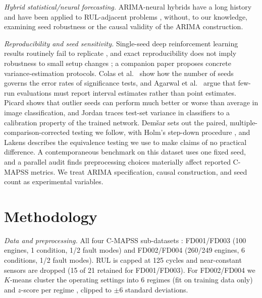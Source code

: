 \documentclass[conference]{IEEEtran}
\begin{document}
\emph{Hybrid statistical/neural forecasting.} ARIMA-neural hybrids have a long history \cite{zhang2003} and have been applied to RUL-adjacent problems \cite{arimalstmvalve2022}, without, to our knowledge, examining seed robustness or the causal validity of the ARIMA construction.

\emph{Reproducibility and seed sensitivity.} Single-seed deep reinforcement learning results routinely fail to replicate \cite{henderson2018}, and exact reproducibility does not imply robustness to small setup changes \cite{bouthillier2019}; a companion paper \cite{bouthillier2021} proposes concrete variance-estimation protocols. Colas et al.\ \cite{colas2018} show how the number of seeds governs the error rates of significance tests, and Agarwal et al.\ \cite{agarwal2021} argue that few-run evaluations must report interval estimates rather than point estimates. Picard \cite{picard2021} shows that outlier seeds can perform much better or worse than average in image classification, and Jordan \cite{jordan2024} traces test-set variance in classifiers to a calibration property of the trained network. Dem\v{s}ar \cite{demsar2006} sets out the paired, multiple-comparison-corrected testing we follow, with Holm's step-down procedure \cite{holm1979}, and Lakens \cite{lakens2017} describes the equivalence testing we use to make claims of no practical difference. A contemporaneous benchmark on this dataset \cite{goel2026} uses one fixed seed, and a parallel audit \cite{gupta2026} finds preprocessing choices materially affect reported C-MAPSS metrics. We treat ARIMA specification, causal construction, and seed count as experimental variables.

\section{Methodology}
\emph{Data and preprocessing.} All four C-MAPSS sub-datasets \cite{saxena2008}: FD001/FD003 (100 engines, 1 condition, 1/2 fault modes) and FD002/FD004 (260/249 engines, 6 conditions, 1/2 fault modes). RUL is capped at 125 cycles and near-constant sensors are dropped (15 of 21 retained for FD001/FD003). For FD002/FD004 we $K$-means cluster the operating settings into 6 regimes (fit on training data only) and $z$-score per regime \cite{regimenorm2018}, clipped to $\pm6$ standard deviations.
\end{document}
